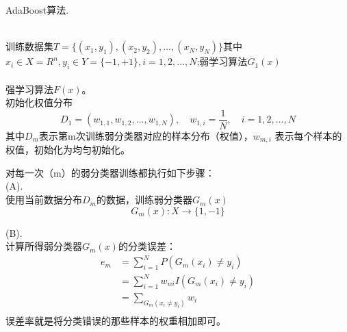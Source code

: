 \documentclass[UTF8]{ctexart}
\begin{document}
\begin{algorithm}[htb] 
	    	\caption{ AdaBoost算法.} 
	    	\label{alg:Framwork} 
	    	\begin{algorithmic}[1] %
	    		\REQUIRE ~~\\ %
	    		训练数据集$T=\{(x_1,y_1),(x_2,y_2),...,(x_N,y_N)\}$其中$x_i \in X=R^n,y_i \in Y=\{-1,+1\},i=1,2,...,N $;弱学习算法$G_1(x)$\\
	    		
	    		
	    		\ENSURE ~~\\ %
				强学习算法$F(x)$。\\
	
	
				\STATE 初始化权值分布
				$$
				D_1 = (w_{1,1},w_{1,2},...,w_{1,N}), \quad w_{1,i} = \frac{1}{N},\quad i = 1,2,...,N
				$$ 
				其中$D_m$表示第m次训练弱分类器对应的样本分布（权值），$w_{m,i}$ 表示每个样本的权值，初始化为均匀初始化。
				
				
				\STATE 对每一次（m）的弱分类器训练都执行如下步骤：\\
				(A).\\
				使用当前数据分布$D_m$的数据，训练弱分类器$G_m(x)$
				$$
				G_m(x):X \rightarrow \{1,-1\}
				$$
				
				(B).\\
				计算所得弱分类器$G_m(x)$的分类误差：
				$$
				\begin{aligned}
				 e_m &= \sum_{i=1}^{N}P(G_m(x_i) \ne y_i)\\
				 &= \sum_{i=1}^{N}w_{wi} I(G_m(x_i) \ne y_i)\\
				 &= \sum_{G_m(x_i \neq y_i)}w_i\\
				\end{aligned}
				$$
				误差率就是将分类错误的那些样本的权重相加即可。
				

\end{algorithmic}
\end{algorithm}
\end{document}
